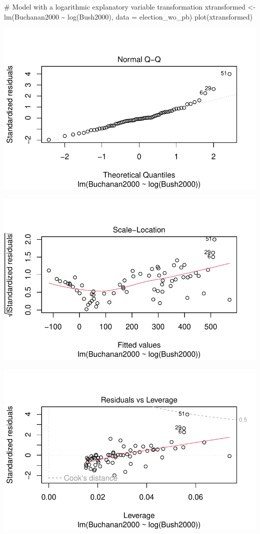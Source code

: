 \documentclass[
  letterpaper,
  DIV=11,
  numbers=noendperiod]{scrartcl}
\newenvironment{Shaded}{\begin{snugshade}}{\end{snugshade}}
\newcommand{\AttributeTok}[1]{\textcolor[rgb]{0.40,0.45,0.13}{#1}}
\newcommand{\CommentTok}[1]{\textcolor[rgb]{0.37,0.37,0.37}{#1}}
\newcommand{\FunctionTok}[1]{\textcolor[rgb]{0.28,0.35,0.67}{#1}}
\newcommand{\NormalTok}[1]{\textcolor[rgb]{0.00,0.23,0.31}{#1}}
\newcommand{\OtherTok}[1]{\textcolor[rgb]{0.00,0.23,0.31}{#1}}
\newcommand{\SpecialCharTok}[1]{\textcolor[rgb]{0.37,0.37,0.37}{#1}}
\begin{document}
\begin{Shaded}
\begin{Highlighting}[]
\CommentTok{\# Model with a logarithmic explanatory variable transformation}
\NormalTok{xtransformed }\OtherTok{\textless{}{-}} \FunctionTok{lm}\NormalTok{(Buchanan2000 }\SpecialCharTok{\textasciitilde{}} \FunctionTok{log}\NormalTok{(Bush2000), }\AttributeTok{data =}\NormalTok{ election\_wo\_pb)}
\FunctionTok{plot}\NormalTok{(xtransformed)}
\end{Highlighting}
\end{Shaded}

\includegraphics{case_study_1_files/figure-pdf/unnamed-chunk-6-7.pdf}

\includegraphics{case_study_1_files/figure-pdf/unnamed-chunk-6-8.pdf}

\includegraphics{case_study_1_files/figure-pdf/unnamed-chunk-6-9.pdf}
\end{document}
